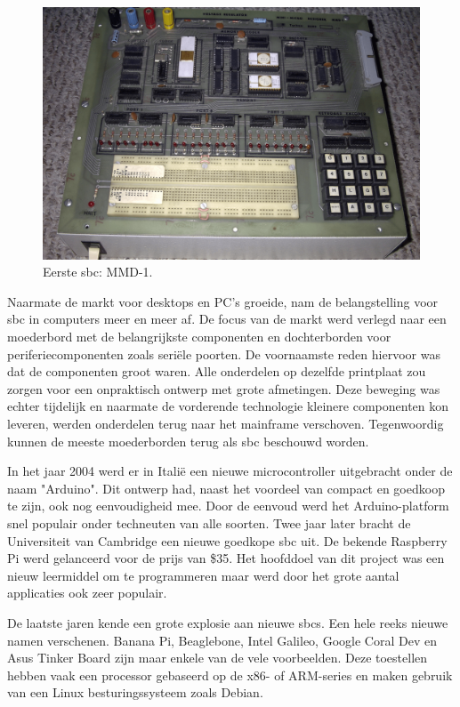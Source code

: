 	\begin{figure}
		\centering
		\includegraphics[width=120mm]{afbeeldingen/Early_1976_MMD1_Prototype_most_chips_removed.PNG}
		\caption[Eerste SBC: MMD-1.]{Eerste \gls{sbc}: MMD-1\cite{bron:fotoeerstesbc}.}
		\label{fig:eersteSBC}
	\end{figure}
	
	Naarmate de markt voor desktops en PC's groeide, nam de belangstelling voor \gls{sbc} in computers meer en meer af. De focus van de markt werd verlegd naar een moederbord met de belangrijkste componenten en dochterborden voor periferiecomponenten zoals seri\"ele poorten. De voornaamste reden hiervoor was dat de componenten groot waren. Alle onderdelen op dezelfde printplaat zou zorgen voor een onpraktisch ontwerp met grote afmetingen. Deze beweging was echter tijdelijk en naarmate de vorderende technologie kleinere componenten kon leveren, werden onderdelen terug naar het mainframe verschoven. Tegenwoordig kunnen de meeste moederborden terug als \gls{sbc} beschouwd worden. 

	
	In het jaar 2004 werd er in Itali\"e een nieuwe microcontroller uitgebracht onder de naam "Arduino". Dit ontwerp had, naast het voordeel van compact en goedkoop te zijn, ook nog eenvoudigheid mee. Door de eenvoud werd het Arduino-platform snel populair onder techneuten van alle soorten. 
	Twee jaar later bracht de Universiteit van Cambridge een nieuwe goedkope \gls{sbc} uit. De bekende Raspberry Pi werd gelanceerd voor de prijs van \$35. Het hoofddoel van dit project was een nieuw leermiddel om te programmeren maar werd door het grote aantal applicaties ook zeer populair. \label{raspberry}
	
	De laatste jaren kende een grote explosie aan nieuwe \gls{sbc}s. Een hele reeks nieuwe namen verschenen. Banana Pi, Beaglebone, Intel Galileo, Google Coral Dev en Asus Tinker Board zijn maar enkele van de vele voorbeelden. Deze toestellen hebben vaak een processor gebaseerd op de x86- of ARM-series en maken gebruik van een Linux besturingssysteem zoals Debian.
	

